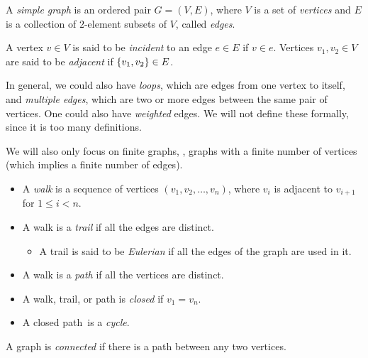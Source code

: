 \begin{definition} \label{def:graph}
    A \emph{simple graph} is an ordered pair $G = (V, E)$, where $V$ is a
    set of \emph{vertices} and $E$ is a collection of $2$-element subsets of
    $V$, called \emph{edges}.

    A vertex $v \in V$ is said to be \emph{incident} to an edge $e \in E$ if
    $v \in e$.
    Vertices $v_1, v_2 \in V$ are said to be \emph{adjacent} if
    $\set{v_1, v_2} \in E$.
\end{definition}
In general, we could also have \emph{loops}, which are edges from one vertex
to itself, and \emph{multiple edges}, which are two or more edges between
the same pair of vertices.
One could also have \emph{weighted} edges.
We will not define these formally, since it is too many definitions.

We will also only focus on finite graphs, \ie, graphs with a finite number
of vertices (which implies a finite number of edges).

\begin{definition} \label{def:graph:walk}
    \leavevmode
    \begin{itemize}
        \item A \emph{walk} is a sequence of vertices
        $(v_1, v_2, \dots, v_n)$, where $v_i$ is adjacent to $v_{i+1}$ for
        $1 \leq i < n$.
        \item A walk is a \emph{trail} if all the edges are distinct.
        \begin{itemize}
            \item A trail is said to be \emph{Eulerian} if all the edges of
            the graph are used in it.
        \end{itemize}
        \item A walk is a \emph{path} if all the vertices are distinct.
        \item A walk, trail, or path is \emph{closed} if $v_1 = v_n$.
        \item A closed path\footnotemark\ is a \emph{cycle}.
    \end{itemize}
\end{definition}

\begin{definition}[Connectedness] \label{def:graph:connected}
    A graph is \emph{connected} if there is a path between any two vertices.
\end{definition}

